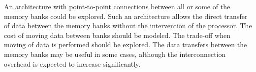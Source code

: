 An architecture with point-to-point connections between all or some of the memory banks could be explored. 
Such an architecture allows the direct transfer of data between the memory banks without the intervention of the processor.
The cost of moving data between banks should be modeled.
The trade-off when moving of data is performed should be explored.
The data transfers between the memory banks may be useful in some cases, although the interconnection overhead is expected to increase significantly.




